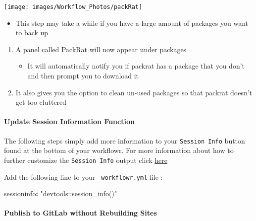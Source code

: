 \documentclass[openany]{article}
\newenvironment{Shaded}{\begin{snugshade}}{\end{snugshade}}
\newcommand{\NormalTok}[1]{#1}
\newcommand{\OperatorTok}[1]{\textcolor[rgb]{0.81,0.36,0.00}{\textbf{#1}}}
\newcommand{\StringTok}[1]{\textcolor[rgb]{0.31,0.60,0.02}{#1}}
\providecommand{\tightlist}{%
  \setlength{\itemsep}{0pt}\setlength{\parskip}{0pt}}
\let\oldparagraph\paragraph
\renewcommand{\paragraph}[1]{\oldparagraph{#1}\mbox{}}
\begin{document}
\begin{center}\texttt{[image: images/Workflow\_Photos/packRat]} \end{center}

\begin{itemize}
\tightlist
\item
  This step may take a while if you have a large amount of packages you want to back up
\end{itemize}

\begin{enumerate}
\def\labelenumi{\arabic{enumi}.}
\setcounter{enumi}{2}
\tightlist
\item
  A panel called PackRat will now appear under packages

  \begin{itemize}
  \tightlist
  \item
    It will automatically notify you if packrat has a package that you don't and then prompt you to download it
  \end{itemize}
\item
  It also gives you the option to clean un-used packages so that packrat doesn't get too cluttered
\end{enumerate}

\hypertarget{update-session-information-function-1}{%
\paragraph{Update Session Information Function}\label{update-session-information-function-1}}

The following steps simply add more information to your \texttt{Session\ Info} button found at the bottom of your workflowr. For more information about how to further customize the \texttt{Session\ Info} output click \href{https://jdblischak.github.io/workflowr/articles/wflow-02-customization.html}{here}

Add the following line to your \texttt{\_workflowr.yml} file :

\begin{Shaded}
\begin{Highlighting}[]
\NormalTok{sessioninfo}\OperatorTok{:}\StringTok{ "devtools::session_info()"}
\end{Highlighting}
\end{Shaded}

\hypertarget{publish-to-gitlab-without-rebuilding-sites-1}{%
\paragraph{Publish to GitLab without Rebuilding Sites}\label{publish-to-gitlab-without-rebuilding-sites-1}}
\end{document}
